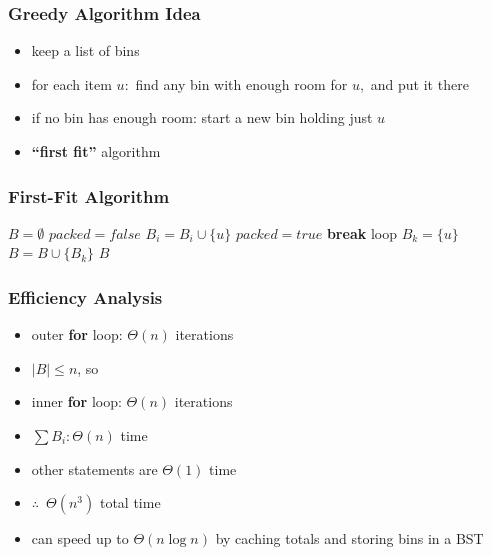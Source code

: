 \documentclass[10pt,aspectratio=169]{beamer}
\begin{document}
\begin{frame} \frametitle{Greedy Algorithm Idea}
  \begin{itemize}
    \item keep a list of bins
    \item for each item $u:$ find any bin with enough room for $u,$ and put it there
    \item if no bin has enough room: start a new bin holding just $u$
    \item \textbf{``first fit''} algorithm
  \end{itemize}
\end{frame}

\begin{frame} \frametitle{First-Fit Algorithm}
  {\footnotesize
  \begin{algorithmic}[1]
      \State $B = \emptyset$ 
        \State $packed = false$
           
            \State $B_i = B_i \cup \{ u \}$
            \State $packed = true$
            \State \textbf{break} loop
          \EndIf
        \EndFor
          \State $B_k = \{ u \} $ 
          \State $B = B \cup \{ B_k \}$
        \EndIf
      \EndFor
      \State \Return $B$
    \EndFunction
  \end{algorithmic}
  }
\end{frame}

\begin{frame} \frametitle{Efficiency Analysis}
\begin{itemize}
  \item outer \textbf{for} loop: $\Theta(n)$ iterations
  \item $|B| \leq n$, so
  \item inner \textbf{for} loop: $\Theta(n)$ iterations
  \item $\sum B_i: \Theta(n)$ time
  \item other statements are $\Theta(1)$ time
  \item $\therefore \enspace \Theta(n^3)$ total time
  \item can speed up to $\Theta(n \log n)$ by caching totals and storing bins in a BST
\end{itemize}
\end{frame}
\end{document}

